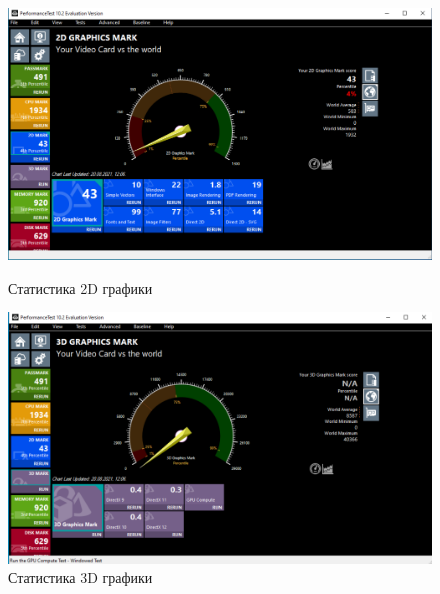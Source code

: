 \documentclass[a4paper,14pt]{extarticle}
\begin{document}
\clearpage
\begin{figure}[h!]
	\centering
	\begin{minipage}[h]{0.48\linewidth}
		\includegraphics[width=1\linewidth]{images/2d-stat}
		\caption{Статистика 2D графики}
		\label{fig:2d-stat}
	\end{minipage}
\hfill
\begin{minipage}[h]{0.48\linewidth}
	\includegraphics[width=1\linewidth]{images/3d-stat}
	\caption{Статистика 3D графики}
	\label{fig:3d-stat}
\end{minipage}
\end{figure}
\end{document}
